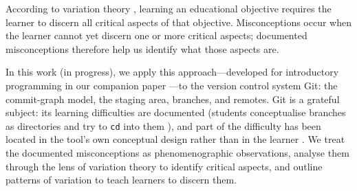 According to variation theory \autocite[See][]{NCOL}, learning an educational
objective requires the learner to discern all critical aspects of that
objective. Misconceptions occur when the learner cannot yet discern one or
more critical aspects; documented misconceptions therefore help us identify
what those aspects are.

In this work (in progress), we apply this approach---developed for
introductory programming in our companion paper
\autocite{VTProgMisconceptions}---to the version control system Git: the
commit-graph model, the staging area, branches, and remotes. Git is a
grateful subject: its learning difficulties are documented (students
conceptualise branches as directories and try to \texttt{cd} into them
\autocite{IsomottonenCochez2014}), and part of the difficulty has been
located in the tool's own conceptual design rather than in the learner
\autocite{DeRossoJackson2016Gitless}. We treat the documented
misconceptions as phenomenographic observations, analyse them through the
lens of variation theory to identify critical aspects, and outline patterns
of variation to teach learners to discern them.
